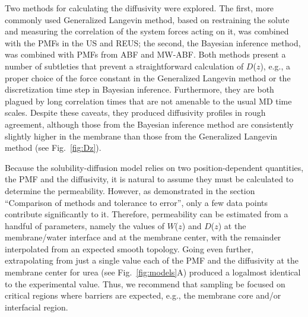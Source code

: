 Two methods for calculating the diffusivity were explored.  The first, more commonly used Generalized Langevin method, based on restraining the solute and measuring the correlation of the system forces acting on it, was combined with the PMFs in the US and REUS; the second, the Bayesian inference method, was combined with PMFs from ABF and MW-ABF.  Both methods present a number of subtleties that prevent a straightforward calculation of $D$($z$), e.g., a proper choice of the force constant in the Generalized Langevin method or the discretization time step in Bayesian inference.  Furthermore, they are both plagued by long correlation times that are not amenable to the usual MD time scales.  Despite these caveats, they produced diffusivity profiles in rough agreement, although those from the Bayesian inference method are consistently slightly higher in the membrane than those from the Generalized Langevin method (see Fig.~\ref{fig:Dz}).

Because the solubility-diffusion model relies on two position-dependent quantities, the PMF and the diffusivity, it is natural to assume they must be calculated to determine the permeability.  However, as demonstrated in the section ``Comparison of methods and tolerance to error'', only a few data points contribute significantly to it.  Therefore, permeability can be estimated from a handful of parameters, namely the values of $W$($z$) and $D$($z$) at the membrane/water interface and at the membrane center, with the remainder interpolated from an expected smooth topology.  Going even further, extrapolating from just a single value each of the PMF and the diffusivity at the membrane center for urea (see Fig.~\ref{fig:models}A) produced a log\perm almost identical to the experimental value.  Thus, we recommend that sampling be focused on critical regions where barriers are expected, e.g., the membrane core and/or interfacial region.

